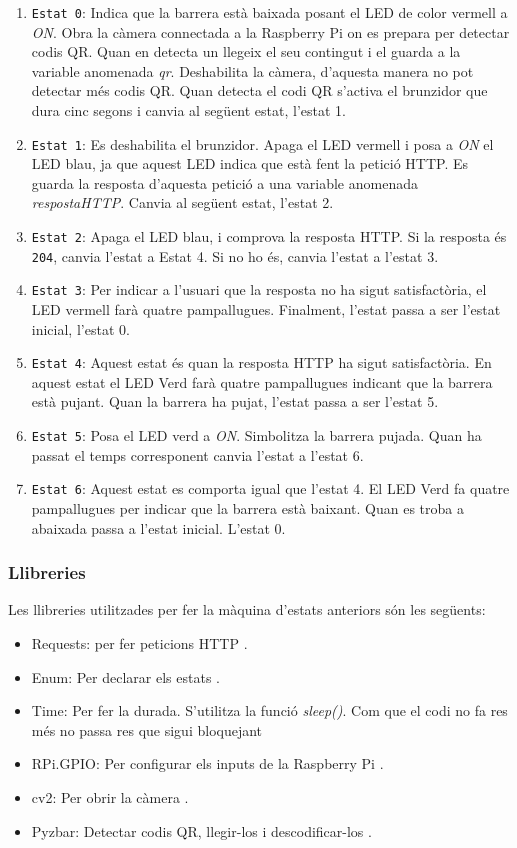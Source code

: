 \begin{enumerate}
    \item \texttt{Estat 0}: Indica que la barrera està baixada posant el LED de color vermell a \emph{ON}.
    Obra la càmera connectada a la Raspberry Pi on es prepara per detectar codis QR.
    Quan en detecta un llegeix el seu contingut i el guarda a la variable anomenada
    \emph{qr}.
    Deshabilita la càmera, d'aquesta manera no pot detectar més codis QR.
    Quan detecta el codi QR s'activa el brunzidor que dura cinc segons i canvia al següent estat, l'estat 1.
    \item \texttt{Estat 1}: Es deshabilita el brunzidor. Apaga el LED vermell i posa a \emph{ON} el LED blau, ja
    que aquest LED indica que està fent la petició HTTP. Es guarda la resposta d'aquesta petició
    a una variable anomenada \emph{respostaHTTP}. Canvia al següent estat, l'estat 2.
    \item \texttt{Estat 2}: Apaga el LED blau, i comprova la resposta HTTP. Si la resposta
    és \texttt{204}, canvia l'estat a Estat 4. Si no ho és, canvia l'estat a l'estat 3.
    \item \texttt{Estat 3}: Per indicar a l'usuari que la resposta no ha sigut
    satisfactòria, el LED vermell farà quatre pampallugues.
    Finalment, l'estat passa a ser l'estat inicial, l'estat 0.
    \item \texttt{Estat 4}: Aquest estat és quan la resposta HTTP ha sigut satisfactòria.
    En aquest estat el LED Verd farà quatre pampallugues indicant que la barrera està pujant.
    Quan la barrera ha pujat, l'estat passa a ser l'estat 5.
    \item \texttt{Estat 5}: Posa el LED verd a \emph{ON}. Simbolitza la barrera pujada.
    Quan ha passat el temps corresponent canvia l'estat a l'estat 6.
    \item \texttt{Estat 6}: Aquest estat es comporta igual que l'estat 4. El LED Verd
    fa quatre pampallugues per indicar que la barrera està baixant.
    Quan es troba a abaixada passa a l'estat inicial. L'estat 0.
\end{enumerate}


\subsubsection{Llibreries}
Les llibreries utilitzades per fer la màquina d'estats anteriors
són les següents:
\begin{itemize}
    \item Requests: per fer peticions HTTP \autocite{requests}.
    \item Enum: Per declarar els estats \autocite{enum_python}.
    \item Time: Per fer la durada. S'utilitza la funció \emph{sleep()}.
    Com que el codi no fa res més no passa res que sigui bloquejant \autocite{sleep_python}
    \item RPi.GPIO: Per configurar els inputs de la Raspberry Pi \autocite{gpio_rasp}.
    \item cv2: Per obrir la càmera \autocite{cv2}.
    \item Pyzbar: Detectar codis QR, llegir-los i descodificar-los \autocite{pyzbar}.
\end{itemize}

